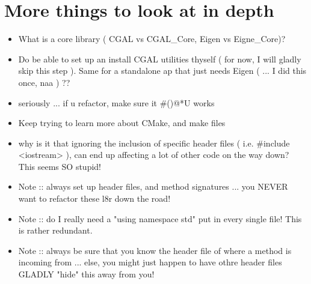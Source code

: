 \documentclass{article}
\begin{document}
\section{More things to look at in depth}
\begin{itemize}
	\item What is a core library ( CGAL vs CGAL_Core, Eigen vs Eigne_Core)?
	\item Do be able to set up an install CGAL utilities thyself ( for now, I will gladly skip this step ). Same for a standalone ap that just needs Eigen ( ... I did this once, naa ) ?? 
	\item seriously ... if u refactor, make sure it #()@*U works
	\item Keep trying to learn more about CMake, and make files
	\item why is it that ignoring the inclusion of specific header files ( i.e. #include <iostream> ), can end up affecting a lot of other code on the way down? This seems SO stupid!
	\item Note :: always set up header files, and method signatures ... you NEVER want to refactor these l8r down the road!
	\item Note :: do I really need a "using namespace std" put in every single file! This is rather redundant.
	\item Note :: always be sure that you know the header file of where a method is incoming from ... else, you might just happen to have othre header files GLADLY "hide" this away from you! 
\end{itemize}
\end{document}
